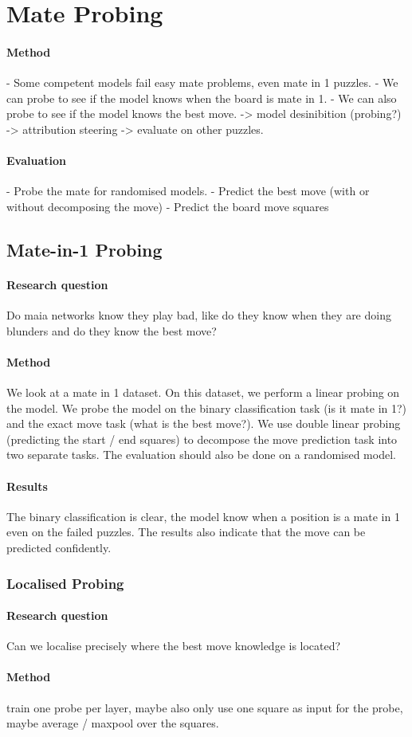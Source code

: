 \section{Mate Probing}
\paragraph{Method}
- Some competent models fail easy mate problems, even mate in 1 puzzles.
- We can probe to see if the model knows when the board is mate in 1.
- We can also probe to see if the model knows the best move.
-> model desinibition (probing?)
-> attribution steering ->  evaluate on other puzzles.

\paragraph{Evaluation}
- Probe the mate for randomised models.
- Predict the best move (with or without decomposing the move)
- Predict the board move squares

\subsection{Mate-in-1 Probing}
\paragraph{Research question} Do maia networks know they play bad, like do they know when they are doing blunders and do they know the best move?

\paragraph{Method} We look at a mate in 1 dataset. On this dataset, we perform a linear probing on the model. We probe the model on the binary classification task (is it mate in 1?) and the exact move task (what is the best move?). We use double linear probing (predicting the start / end squares) to decompose the move prediction task into two separate tasks.
The evaluation should also be done on a randomised model.

\paragraph{Results} The binary classification is clear, the model know when a position is a mate in 1 even on the failed puzzles. The results also indicate that the move can be predicted confidently.

\subsubsection{Localised Probing}
\paragraph{Research question}
Can we localise precisely where the best move knowledge is located?
\paragraph{Method}
train one probe per layer, maybe also only use one square as input for the probe, maybe average / maxpool over the squares.
